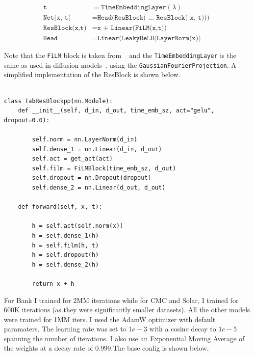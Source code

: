 \begin{align}
    \texttt{t} &= \texttt{TimeEmbeddingLayer}(\lambda) \\
    \texttt{Net(x, t)} &= \texttt{Head(ResBlock( ... ResBlock( x, t))) } \\
    \texttt{ResBlock(x,t)} &= \texttt{x + Linear(FiLM(x,t))} \\
    \texttt{Head} &= \texttt{Linear(LeakyReLU(LayerNorm(x))}
\end{align}

Note that the \texttt{FiLM} block is taken from ~\cite{perez2018film} and the \texttt{TimeEmbeddingLayer} is the same as used in diffusion models~\cite{song2020score}, using the \texttt{GaussianFourierProjection}.
A simplified implementation of the ResBlock is shown below.

\begin{verbatim}

class TabResBlockpp(nn.Module):
    def __init__(self, d_in, d_out, time_emb_sz, act="gelu", dropout=0.0):
    
        self.norm = nn.LayerNorm(d_in)
        self.dense_1 = nn.Linear(d_in, d_out)
        self.act = get_act(act)
        self.film = FiLMBlock(time_emb_sz, d_out)
        self.dropout = nn.Dropout(dropout)
        self.dense_2 = nn.Linear(d_out, d_out)

    def forward(self, x, t):
        
        h = self.act(self.norm(x))
        h = self.dense_1(h)
        h = self.film(h, t)
        h = self.dropout(h)
        h = self.dense_2(h)

        return x + h
\end{verbatim}

For Bank I trained for 2MM iterations while for CMC and Solar, I trained for 600K iterations (as they were significantly smaller datasets). All the other models were trained for 1MM iters. I used the AdamW optimizer with default paramaters. The learning rate was set to $1e-3$ with a cosine decay to $1e-5$ spanning the number of iterations. I also use an Exponential Moving Average of the weights at a decay rate of $0.999$.The base config is shown below.

